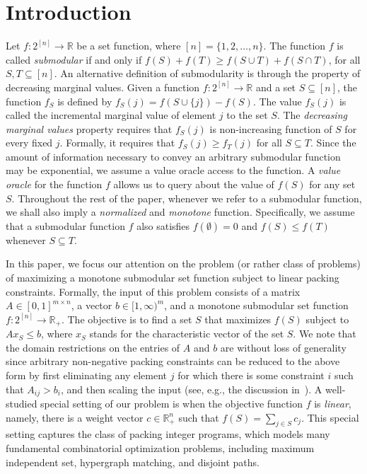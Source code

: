 \documentclass[11pt]{article}
\theoremstyle{plain}
\theoremstyle{definition}
\newcommand{\bbR}{\mathbb{R}}
\begin{document}
\section{Introduction} \label{sec:Intro} Let $f: 2^{[n]}
\rightarrow \bbR$ be a set function, where $[n] = \{1, 2, \ldots,
n\}$. The function $f$ is called \emph{submodular} if and only if
$f(S) + f(T) \geq f(S \cup T) + f(S \cap T)$, for all $S, T
\subseteq [n]$. An alternative definition of submodularity is
through the property of decreasing marginal values. Given a
function $f: 2^{[n]} \rightarrow \bbR$ and a set $S \subseteq
[n]$, the function $f_S$ is defined by $f_S(j) = f(S \cup \{j\}) -
f(S)$. The value $f_S(j)$ is called the incremental marginal value
of element $j$ to the set $S$. The \emph{decreasing marginal
values} property requires that $f_S(j)$ is non-increasing function
of $S$ for every fixed $j$. Formally, it requires that $f_S(j)
\geq f_T(j)$ for all $S \subseteq T$. Since the amount of
information necessary to convey an arbitrary submodular function
may be exponential, we assume a value oracle access to the
function. A \emph{value oracle} for the function $f$ allows us to
query about the value of $f(S)$ for any set $S$. Throughout the
rest of the paper, whenever we refer to a submodular function, we
shall also imply a \emph{normalized} and \emph{monotone} function.
Specifically, we assume that a submodular function $f$ also
satisfies $f(\emptyset) = 0$ and $f(S) \leq f(T)$ whenever $S
\subseteq T$.

In this paper, we focus our attention on the problem (or rather
class of problems) of maximizing a monotone submodular set
function subject to linear packing constraints. Formally, the
input of this problem consists of a matrix $A \in [0,1]^{m \times
n}$, a vector $b \in [1,\infty)^m$, and a monotone submodular set
function $f: 2^{[n]} \rightarrow \bbR_+$. The objective is to find
a set $S$ that maximizes $f(S)$ subject to $A x_{S} \leq b$, where
$x_S$ stands for the characteristic vector of the set $S$. We note
that the domain restrictions on the entries of $A$ and $b$ are
without loss of generality since arbitrary non-negative packing
constraints can be reduced to the above form by first eliminating
any element $j$ for which there is some constraint $i$ such that
$A_{ij} > b_i$, and then scaling the input (see, e.g., the
discussion in~\cite{Srinivasan99}). A well-studied special setting
of our problem is when the objective function $f$ is
\emph{linear}, namely, there is a weight vector $c \in \bbR_+^n$
such that $f(S) = \sum_{j \in S} c_j$. This special setting
captures the class of packing integer programs, which models many
fundamental combinatorial optimization problems, including maximum
independent set, hypergraph matching, and disjoint paths.
\end{document}

